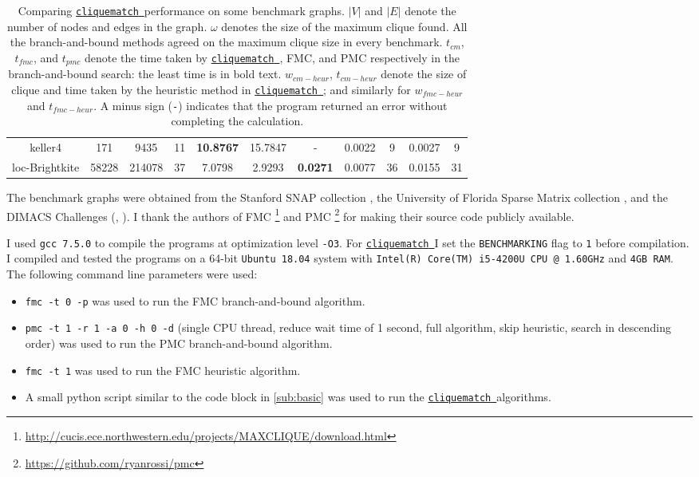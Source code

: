 \documentclass[12pt]{article}
\newcommand{\clqm}{\href{https://github.com/ahgamut/cliquematch}{\texttt{cliquematch}~}}
\begin{document}
\begin{appendix}
\begin{table}[htb]
\begin{tabular}{|c|c|c|c|c|c|c|c|c|c|c|}
			keller4          & 171     & 9435     & 11       & \textbf{10.8767} & 15.7847         & -               & 0.0022        & 9                  & 0.0027         & 9                   \\
			loc-Brightkite   & 58228   & 214078   & 37       & 7.0798           & 2.9293          & \textbf{0.0271} & 0.0077        & 36                 & 0.0155         & 31                  \\
			\bottomrule
		\end{tabular}
		\normalsize
		\caption{Comparing \clqm performance on some benchmark graphs. $|V|$ and
			$|E|$ denote the number of nodes and edges in the graph.
			$\omega$ denotes the size of the maximum clique found. All the
			branch-and-bound methods agreed on the maximum clique size in every benchmark.
			$t_{cm}$, $t_{fmc}$, and $t_{pmc}$ denote the time taken by \clqm, FMC, and PMC respectively in the branch-and-bound search: the least time is in bold text.
			$w_{cm-heur}$, $t_{cm-heur}$ denote the size of clique and time taken by the heuristic method
			in \clqm; and similarly for $w_{fmc-heur}$ and $t_{fmc-heur}$. A minus
			sign (\texttt{-}) indicates that the program returned an error without
			completing the calculation.}
	\end{table}

	The benchmark graphs were obtained from the Stanford SNAP collection
	\citep{snapnets}, the University of Florida Sparse Matrix collection
	\citep{ufsparse}, and the DIMACS Challenges (\cite{dimacs2},
	\cite{dimacs10}). I thank the authors of FMC \footnote{\url{http://cucis.ece.northwestern.edu/projects/MAXCLIQUE/download.html}} and PMC
	\footnote{\url{https://github.com/ryanrossi/pmc}} for making their source code publicly available.

	I used \texttt{gcc 7.5.0} to compile the programs at optimization level
	\texttt{-O3}. For \clqm I set the \texttt{BENCHMARKING} flag to
	\texttt{1} before compilation. I compiled and tested the programs on a 64-bit
	\texttt{Ubuntu 18.04} system with \texttt{Intel(R) Core(TM) i5-4200U CPU @ 1.60GHz} and \texttt{4GB RAM}. The
	following command line parameters were used:
	\begin{itemize}
		\item \texttt{fmc -t 0 -p} was used to run the FMC branch-and-bound algorithm.
		\item \texttt{pmc -t 1 -r 1 -a 0 -h 0 -d} (single CPU thread, reduce wait time of 1 second, full algorithm, skip heuristic, search in descending order) was used to run the PMC branch-and-bound algorithm.
		\item \texttt{fmc -t 1} was used to run the FMC heuristic algorithm.
		\item A small python script similar to the code block in \autoref{sub:basic} was used to run
		      the \clqm algorithms.
	\end{itemize}

\end{appendix}
\end{document}
